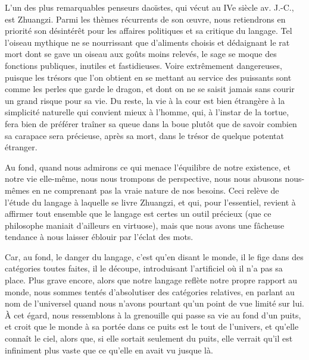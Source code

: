 \documentclass[11pt,a4paper]{article} %
\begin{document}
L'un des plus remarquables penseurs daoïstes, qui vécut au IVe siècle av.
J.-C., est
Zhuangzi.
Parmi les thèmes récurrents de son œuvre, nous retiendrons en priorité son désintérêt pour les affaires politiques et sa critique du langage.
Tel l'oiseau mythique ne se
nourrissant que d'aliments choisis et dédaignant le rat mort dont se gave un oiseau aux
goûts moins relevés, le sage se moque des fonctions publiques, inutiles et fastidieuses.
Voire extrêmement dangereuses, puisque les trésors que l'on obtient en se mettant au service des puissants sont comme les perles que garde le dragon, et dont on ne se saisit
jamais sans courir un grand risque pour sa vie.
Du reste, la vie à la cour est bien étrangère
à la simplicité naturelle qui convient mieux à l'homme, qui, à l'instar de la tortue, fera
bien de préférer traîner sa queue dans la boue plutôt que de savoir combien sa carapace
sera précieuse, après sa mort, dans le trésor de quelque potentat étranger.

Au fond, quand nous admirons ce qui menace l'équilibre de notre existence, et notre vie
elle-même, nous nous trompons de perspective, nous nous abusons nous-mêmes en ne
comprenant pas la vraie nature de nos besoins.
Ceci relève de l'étude du langage à laquelle se livre Zhuangzi, et qui, pour l'essentiel, revient à affirmer tout ensemble que le
langage est certes un outil précieux (que ce philosophe maniait d'ailleurs en virtuose),
mais que nous avons une fâcheuse tendance à nous laisser éblouir par l'éclat des mots.

Car, au fond, le danger du langage, c'est qu'en disant le monde, il le fige dans des catégories toutes faites, il le découpe, introduisant l'artificiel où il n'a pas sa place.
Plus grave
encore, alors que notre langage reflète notre propre rapport au monde, nous sommes tentés d'absolutiser des catégories relatives, en parlant au nom de l'universel quand nous
n'avons pourtant qu'un point de vue limité sur lui.
À cet égard, nous ressemblons à la
grenouille qui passe sa vie au fond d'un puits, et croit que le monde à sa portée dans ce
puits est le tout de l'univers, et qu'elle connaît le ciel, alors que, si elle sortait seulement
du puits, elle verrait qu'il est infiniment plus vaste que ce qu'elle en avait vu jusque là.
\end{document}
